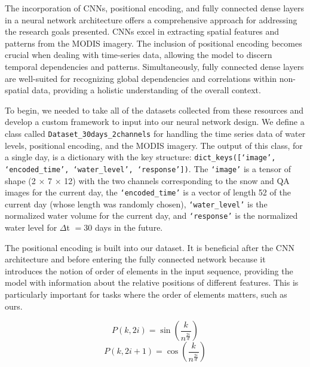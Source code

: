 \documentclass[10pt,twocolumn,letterpaper]{article}
\begin{document}
The incorporation of CNNs, positional encoding, and fully connected dense layers in a neural network architecture offers a comprehensive approach for addressing the research goals presented. CNNs excel in extracting spatial features and patterns from the MODIS imagery. The inclusion of positional encoding becomes crucial when dealing with time-series data, allowing the model to discern temporal dependencies and patterns. Simultaneously, fully connected dense layers are well-suited for recognizing global dependencies and correlations within non-spatial data, providing a holistic understanding of the overall context. 

To begin, we needed to take all of the datasets collected from these resources and develop a custom framework to input into our neural network design. We define a class called \texttt{Dataset\_30days\_2channels} for handling the time series data of water levels, positional encoding, and the MODIS imagery. The output of this class, for a single day, is a dictionary with the key structure: \texttt{dict\_keys([`image', `encoded\_time', `water\_level', `response'])}. The \texttt{`image'} is a tensor of shape (2 $\times$ 7 $\times$ 12) with the two channels corresponding to the snow and QA images for the current day, the \texttt{`encoded\_time'} is a vector of length 52 of the current day (whose length was randomly chosen), \texttt{`water\_level'} is the normalized water volume for the current day, and \texttt{`response'} is the normalized water level for $\Delta$t $= 30$ days in the future. 

The positional encoding is built into our dataset. It is beneficial after the CNN architecture and before entering the fully connected network because it introduces the notion of order of elements in the input sequence, providing the model with information about the relative positions of different features. This is particularly important for tasks where the order of elements matters, such as ours.

\begin{equation}
P(k, 2i) = \sin\left(\frac{k}{n^{\frac{2i}{d}}}\right)
\end{equation}
\begin{equation}
P(k, 2i+1) = \cos\left(\frac{k}{n^{\frac{2i}{d}}}\right)
\end{equation}
\end{document}
